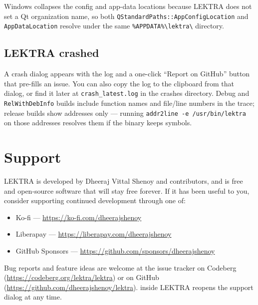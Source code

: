 \documentclass[a4paper,12pt]{article}
\begin{document}
Windows collapses the config and app-data locations because LEKTRA does not set a Qt organization name, so both \texttt{QStandardPaths::AppConfigLocation} and \texttt{AppDataLocation} resolve under the same \texttt{\%APPDATA\%\textbackslash lektra\textbackslash} directory.

\subsection{LEKTRA crashed}
A crash dialog appears with the log and a one-click ``Report on GitHub'' button that pre-fills an issue. You can also copy the log to the clipboard from that dialog, or find it later at \texttt{crash\_latest.log} in the crashes directory. Debug and \texttt{RelWithDebInfo} builds include function names and file/line numbers in the trace; release builds show addresses only — running \texttt{addr2line -e /usr/bin/lektra} on those addresses resolves them if the binary keeps symbols.

\section{Support}

LEKTRA is developed by Dheeraj Vittal Shenoy and contributors, and is free and open-source software that will stay free forever. If it has been useful to you, consider supporting continued development through one of:

\begin{itemize}[leftmargin=*]
    \item Ko-fi — \url{https://ko-fi.com/dheerajshenoy}
    \item Liberapay — \url{https://liberapay.com/dheerajshenoy}
    \item GitHub Sponsors — \url{https://github.com/sponsors/dheerajshenoy}
\end{itemize}

Bug reports and feature ideas are welcome at the issue tracker on Codeberg (\url{https://codeberg.org/lektra/lektra}) or on GitHub (\url{https://github.com/dheerajshenoy/lektra}).  inside LEKTRA reopens the support dialog at any time.
\end{document}
